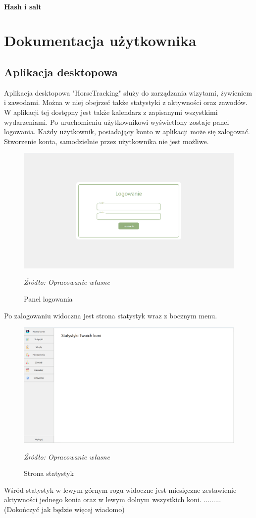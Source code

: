 \documentclass[12pt,oneside]{report}
\begin{document}
\subsubsection{Hash i salt}
\newpage
\chapter{Dokumentacja użytkownika}
\section{Aplikacja desktopowa}
Aplikacja desktopowa "HorseTracking" służy do zarządzania wizytami, żywieniem i zawodami. Można w niej obejrzeć także statystyki z aktywności oraz zawodów. W aplikacji tej dostępny jest także kalendarz z zapisanymi wszystkimi wydarzeniami. Po uruchomieniu użytkownikowi wyświetlony zostaje panel logowania. Każdy użytkownik, posiadający konto w aplikacji może się zalogować. Stworzenie konta, samodzielnie przez użytkownika nie jest możliwe.
\begin{figure}[H]
	\centering
	\includegraphics[scale=0.32]{Logowanie}
	\caption{Panel logowania}
	\textit{Źródło: Opracowanie własne}
	\label{Logowanie}
\end{figure}
Po zalogowaniu widoczna jest strona statystyk wraz z bocznym menu. 
\begin{figure}[H]
\centering
\includegraphics[scale=0.4]{Statystyki}
\caption{Strona statystyk}
\textit{Źródło: Opracowanie własne}
\label{Statystyki}
\end{figure}
Wśród statystyk w lewym górnym rogu widoczne jest miesięczne zestawienie aktywności jednego konia oraz w lewym dolnym wszystkich koni. .........(Dokończyć jak będzie więcej wiadomo)
\end{document}
